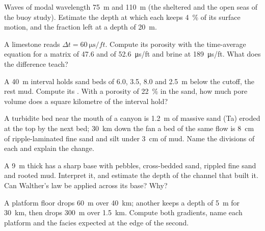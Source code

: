\begin{exercise}[$\star$]\label{exo:b3:facies-models:4}
Waves of modal wavelength \qty{75}{m} and \qty{110}{m} (the sheltered and
the open seas of the buoy study). Estimate the depth at which each keeps
\qty{4}{\percent} of its surface motion, and the fraction left at a depth of
\qty{20}{m}.
\end{exercise}

\begin{exercise}[$\star\star$]\label{exo:b3:facies-models:5}
A limestone reads $\Delta t = \qty{60}{\micro\second/ft}$. Compute its
porosity with the time-average equation for a matrix of 47.6 and of
\qty{52.6}{\micro\second/ft} and brine at \qty{189}{\micro\second/ft}. What
does the difference teach?
\end{exercise}

\begin{exercise}[$\star\star$]\label{exo:b3:facies-models:6}
A \qty{40}{m} interval holds sand beds of 6.0, 3.5, 8.0 and \qty{2.5}{m}
below the cutoff, the rest mud. Compute its . With a
porosity of \qty{22}{\percent} in the sand, how much pore volume does a
square kilometre of the interval hold?
\end{exercise}

\begin{exercise}[$\star\star$]\label{exo:b3:facies-models:7}
A turbidite bed near the mouth of a canyon is \qty{1.2}{m} of massive sand
(Ta) eroded at the top by the next bed; \qty{30}{km} down the fan a bed of
the same flow is \qty{8}{cm} of ripple-laminated fine sand and silt under
\qty{3}{cm} of mud. Name the divisions of each and explain the change.
\end{exercise}

\begin{exercise}[$\star\star$]\label{exo:b3:facies-models:8}
A  \qty{9}{m} thick has a sharp base with pebbles,
cross-bedded sand, rippled fine sand and rooted mud. Interpret it, and
estimate the depth of the channel that built it. Can Walther's law be
applied across its base? Why?
\end{exercise}

\begin{exercise}[$\star\star$]\label{exo:b3:facies-models:9}
A platform floor drops \qty{60}{m} over \qty{40}{km}; another keeps a
depth of \qty{5}{m} for \qty{30}{km}, then drops \qty{300}{m} over
\qty{1.5}{km}. Compute both gradients, name each platform and the facies
expected at the edge of the second.
\end{exercise}


